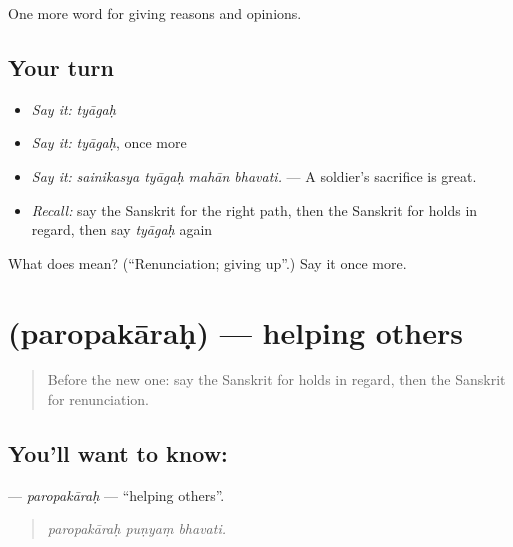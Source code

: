 \begin{grammarlens}[title={What you've built}]
One more word for giving reasons and opinions.
\end{grammarlens}

\subsection*{Your turn}
\begin{itemize}
\raggedright
  \item \emph{Say it:} \emph{tyāgaḥ}
  \item \emph{Say it:} \emph{tyāgaḥ}, once more
  \item \emph{Say it:} \emph{sainikasya tyāgaḥ mahān bhavati.} — A soldier's sacrifice is great.
  \item \emph{Recall:} say the Sanskrit for the right path, then the Sanskrit for holds in regard, then say \emph{tyāgaḥ} again
\end{itemize}

\begin{tcolorbox}[breakable,colback=teal!4,colframe=teal!35!black,title={Before you move on}]
What does  mean? (\textquotedblleft{}Renunciation; giving up\textquotedblright{}.) Say it once more.
\end{tcolorbox}
\section[\texorpdfstring{\sk{परोपकारः} (paropakāraḥ)}{परोपकारः (paropakāraḥ)}]{ (paropakāraḥ) — helping others}

\label{lesson:SA-C359-paropakarah}



\begin{quote}
Before the new one: say the Sanskrit for holds in regard, then the Sanskrit for renunciation.
\end{quote}

\subsection*{You'll want to know: }
\textbf{} — \emph{paropakāraḥ} — \textquotedblleft{}helping others\textquotedblright{}.

\begin{quote}
  
\end{quote}

\begin{quote}
\emph{paropakāraḥ puṇyaṃ bhavati.}
\end{quote}

